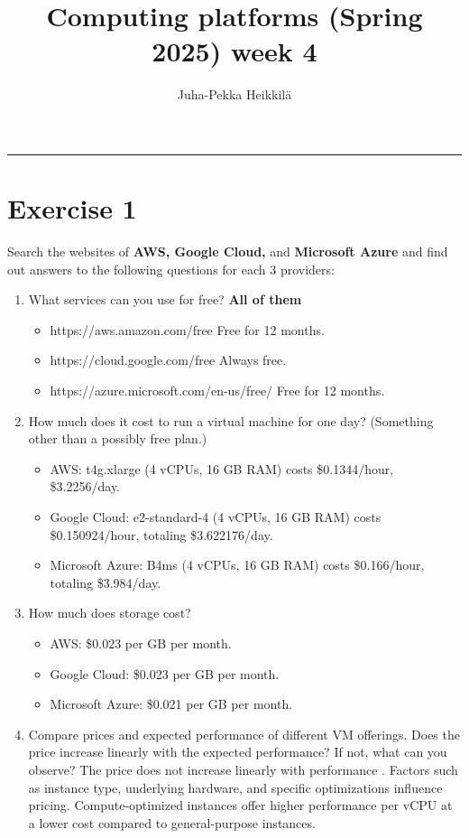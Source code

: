 \documentclass{article}
\title{Computing platforms (Spring 2025)\newline
week 4}
\author{Juha-Pekka Heikkilä}
\renewcommand{\maketitle}{%
  \begin{leftmark}
    \vspace*{\baselineskip} %



    \textbf{\fontsize{18}{36}\selectfont \thetitle} %

     \vspace{0.05cm} %
    \vspace{\baselineskip} %
     \rule{\textwidth}{0.4pt} %

   \end{leftmark}
}
\newcommand{\exercise}[1]{
    \section*{Exercise #1}
    \markboth{Exercise #1}{}
}
\begin{document}
\maketitle


\exercise{1}
Search the websites of \textbf{AWS, Google Cloud,} and 
\textbf{Microsoft Azure} and find out answers to the following
questions for each 3 providers:

\begin{enumerate}
  \item What services can you use for free? \textbf{All of them }
  \begin{itemize}
    \item https://aws.amazon.com/free \cite{aws_free}\newline
      Free for 12 months.
    \item https://cloud.google.com/free \cite{gcp_free} \newline
      Always free.
    \item https://azure.microsoft.com/en-us/free/ \cite{azure_free} \newline
      Free for 12 months.  
  \end{itemize}


  \item How much does it cost to run a virtual machine for
  one day? (Something other than a possibly free plan.)
  \begin{itemize}
    \item AWS: t4g.xlarge (4 vCPUs, 16 GB RAM) costs \$0.1344/hour, \$3.2256/day.
    \item Google Cloud: e2-standard-4 (4 vCPUs, 16 GB RAM) costs \$0.150924/hour, totaling \$3.622176/day.
    \item Microsoft Azure: B4ms (4 vCPUs, 16 GB RAM) costs \$0.166/hour, totaling \$3.984/day.
  \end{itemize}

  \item How much does storage cost?
  \begin{itemize}
    \item AWS: \$0.023 per GB per month.
    \item Google Cloud: \$0.023 per GB per month.
    \item Microsoft Azure: \$0.021 per GB per month.
  \end{itemize}

  \item Compare prices and expected performance
  of different VM offerings. Does the price increase
  linearly with the expected performance? If not, what can
  you observe? \newline
  The price does not increase linearly with performance
  \cite{cloud_pricing_comparison}. Factors such as instance
  type, underlying hardware, and specific optimizations
  influence pricing. Compute-optimized instances offer
  higher performance per vCPU at a lower cost compared
  to general-purpose instances.


\end{enumerate}
\end{document}
